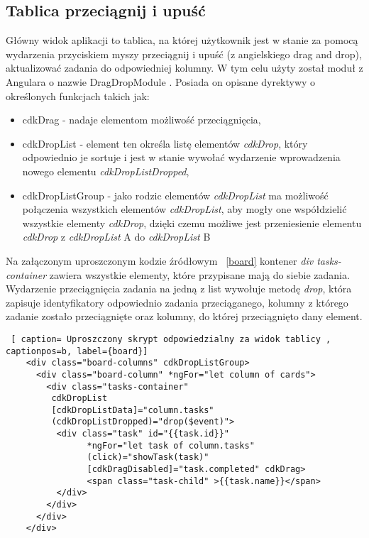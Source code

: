 \subsection{Tablica przeciągnij i upuść}
Główny widok aplikacji to tablica, na której użytkownik jest w stanie za pomocą wydarzenia przyciskiem myszy przeciągnij i upuść (z angielskiego drag and drop), aktualizować zadania do odpowiedniej kolumny. W tym celu użyty został moduł z Angulara o nazwie DragDropModule \cite{draganddrop}. Posiada on opisane dyrektywy o określonych funkcjach takich jak:
\begin{itemize}
	\item cdkDrag - nadaje elementom możliwość przeciągnięcia,
	\item cdkDropList - element ten określa listę elementów \textit{cdkDrop}, który odpowiednio je sortuje i jest w stanie wywołać wydarzenie wprowadzenia nowego elementu \textit{cdkDropListDropped},
	\item cdkDropListGroup - jako rodzic elementów \textit{cdkDropList} ma możliwość połączenia wszystkich elementów \textit{cdkDropList}, aby mogły one współdzielić wszystkie elementy  \textit{cdkDrop}, dzięki czemu możliwe jest  przeniesienie elementu \textit{cdkDrop}  z \textit{cdkDropList} A do \textit{cdkDropList} B
\end{itemize}
Na załączonym uproszczonym kodzie źródłowym ~\ref{board} kontener \textit{div tasks-container} zawiera wszystkie elementy, które przypisane mają do siebie zadania. Wydarzenie przeciągnięcia zadania na jedną z list wywołuje metodę \textit{drop}, która zapisuje identyfikatory odpowiednio zadania przeciąganego, kolumny z którego zadanie zostało przeciągnięte oraz kolumny, do której przeciągnięto dany element.


\begin{lstlisting} [ caption= Uproszczony skrypt odpowiedzialny za widok tablicy , captionpos=b, label={board}]
	<div class="board-columns" cdkDropListGroup>
	  <div class="board-column" *ngFor="let column of cards">
	    <div class="tasks-container"
	     cdkDropList
	     [cdkDropListData]="column.tasks"
	     (cdkDropListDropped)="drop($event)">	
	      <div class="task" id="{{task.id}}" 
                *ngFor="let task of column.tasks" 
                (click)="showTask(task)" 
                [cdkDragDisabled]="task.completed" cdkDrag>
                <span class="task-child" >{{task.name}}</span>
	      </div>
	    </div>
	  </div>
	</div>
\end{lstlisting}
\clearpage
